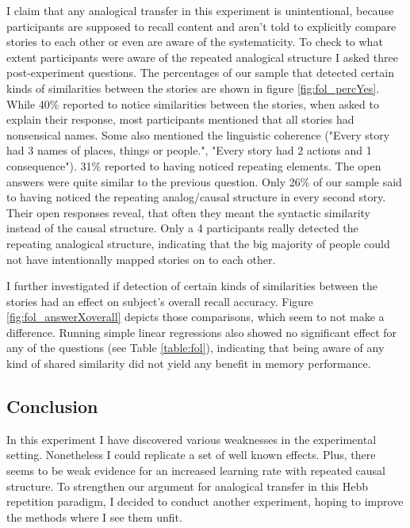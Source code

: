 \documentclass[a4paper,man,natbib,floatsintext,import]{apa6}
\begin{document}
I claim that any analogical transfer in this experiment is unintentional, because participants are supposed to recall content and aren't told to explicitly compare stories to each other or even are aware of the systematicity. To check to what extent participants were aware of the repeated analogical structure I asked three post-experiment questions. The percentages of our sample that detected certain kinds of similarities between the stories are shown in figure \ref{fig:fol_percYes}. While 40\% reported to notice similarities between the stories, when asked to explain their response, most participants mentioned that all stories had nonsensical names. Some also mentioned the linguistic coherence ("Every story had 3 names of places, things or people.", "Every story had 2 actions and 1 consequence"). 31\% reported to having noticed repeating elements. The open answers were quite similar to the previous question. Only 26\% of our sample said to having noticed the repeating analog/causal structure in every second story. Their open responses reveal, that often they meant the syntactic similarity instead of the causal structure. Only a 4 participants really detected the repeating analogical structure, indicating that the big majority of people could not have intentionally mapped stories on to each other.

I further investigated if detection of certain kinds of similarities between the stories had an effect on subject's overall recall accuracy. Figure \ref{fig:fol_answerXoverall} depicts those comparisons, which seem to not make a difference. Running simple linear regressions also showed no significant effect for any of the questions (see Table \ref{table:fol}), indicating that being aware of any kind of shared similarity did not yield any benefit in memory performance.



\subsection{Conclusion}
In this experiment I have discovered various weaknesses in the experimental setting. Nonetheless I could replicate a set of well known effects. Plus, there seems to be weak evidence for an increased learning rate with repeated causal structure. To strengthen our argument for analogical transfer in this Hebb repetition paradigm, I decided to conduct another experiment, hoping to improve the methods where I see them unfit.

\newpage
\end{document}

